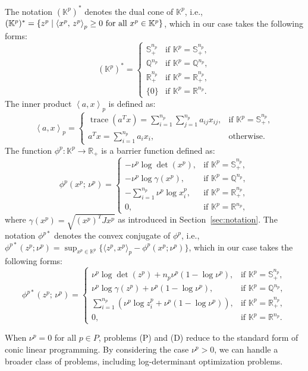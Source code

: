 %
The notation $(\mathbb{K}^p)^*$ denotes the dual cone of $\mathbb{K}^p$, 
i.e., $(\mathbb{K}^p)^* = \{ z^p \mid \left\langle x^p, \, z^p \right\rangle_p \geq 0 \text{ for all } x^p \in \mathbb{K}^p \}$, 
which in our case takes the following forms:
\[
(\mathbb{K}^p)^* = 
\begin{cases}
    \mathbb{S}_{+}^{n_p} & \text{if } \mathbb{K}^{p} = \mathbb{S}_{+}^{n_p},\\
    \mathbb{Q}^{n_p}     & \text{if } \mathbb{K}^{p} = \mathbb{Q}^{n_p},\\
    \mathbb{R}_{+}^{n_p} & \text{if } \mathbb{K}^{p} = \mathbb{R}_{+}^{n_p},\\
    \{0\}                & \text{if } \mathbb{K}^{p} = \mathbb{R}^{n_p}.
\end{cases}
\]
%
The inner product $\left\langle a, x \right\rangle_p$ is defined as:
\[
\left\langle a, x \right\rangle_p = 
\begin{cases}
    \operatorname{trace}(a^T x) 
    = \sum_{i=1}^{n_p} \sum_{j=1}^{n_p} a_{ij} x_{ij}, 
    & \text{if } \mathbb{K}^p = \mathbb{S}_{+}^{n_p},\\[6pt]
    a^T x = \sum_{i=1}^{n_p} a_i x_i, 
    & \text{otherwise}.
\end{cases}
\]
%
The function $\phi^p : \mathbb{K}^p \to \mathbb{R}_+$ is a barrier function defined as:
\[
\phi^p(x^p;\, \nu^p) =
\begin{cases}
    -\nu^p \log \det(x^p), & \text{if } \mathbb{K}^{p} = \mathbb{S}_{+}^{n_p},\\
    -\nu^p \log \gamma(x^p), & \text{if } \mathbb{K}^{p} = \mathbb{Q}^{n_p},\\
    -\sum_{i=1}^{n_p} \nu^p \log x^p_i, & \text{if } \mathbb{K}^{p} = \mathbb{R}_{+}^{n_p},\\
    0, & \text{if } \mathbb{K}^{p} = \mathbb{R}^{n_p},
\end{cases}
\]
where $\gamma(x^p) = \sqrt{(x^p)^T J x^p}$ as introduced in Section~\ref{sec:notation}.
%
The notation $\phi^{p*}$ denotes the convex conjugate of $\phi^p$, 
i.e., $\phi^{p*}(z^p; \nu^p) = \sup_{x^p \in \mathbb{K}^p} \{\langle z^p, x^p \rangle_p - \phi^p(x^p; \nu^p)\}$, 
which in our case takes the following forms:
\[
\phi^{p*}(z^p;\, \nu^p) =
\begin{cases}
    \nu^p \log \det(z^p) + n_p \nu^p (1 - \log \nu^p), 
    & \text{if } \mathbb{K}^{p} = \mathbb{S}_{+}^{n_p},\\[4pt]
    \nu^p \log \gamma(z^p) + \nu^p (1 - \log \nu^p), 
    & \text{if } \mathbb{K}^{p} = \mathbb{Q}^{n_p},\\[4pt]
    \sum_{i=1}^{n_p} \left( \nu^p \log z^p_i + \nu^p (1 - \log \nu^p) \right), 
    & \text{if } \mathbb{K}^{p} = \mathbb{R}_{+}^{n_p},\\[3pt]
    0, & \text{if } \mathbb{K}^{p} = \mathbb{R}^{n_p}.
\end{cases}
\]

When $\nu^p = 0$ for all $p \in P$, problems (P) and (D) reduce to the standard form of conic linear programming.
By considering the case $\nu^p > 0$, we can handle a broader class of problems, including log-determinant optimization problems.